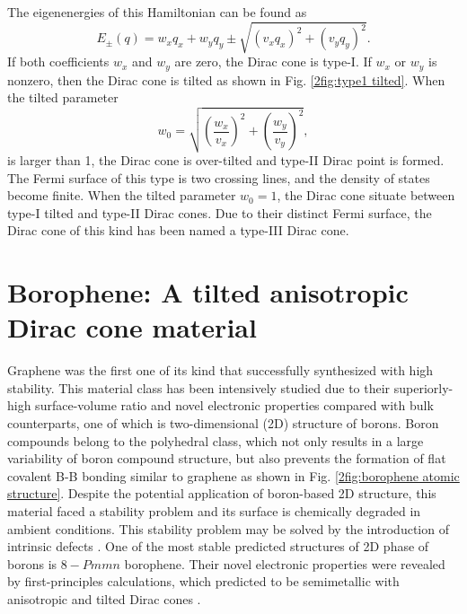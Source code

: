     The eigenenergies of this Hamiltonian can be found as
    \begin{equation} \label{2eq:eigenenergies}
        E_{\pm}(q) = w_{x}q_x + w_{y}q_y \pm \sqrt{(v_x q_x)^2 + (v_y q_y)^2}.
    \end{equation}
    If both coefficients $w_{x}$ and $w_{y}$ are zero, the Dirac cone is type-I.
    If $w_{x}$ or $w_{y}$ is nonzero, then the Dirac cone is tilted as shown in Fig. \ref{2fig:type1 tilted}.
    When the tilted parameter
    \begin{equation} \label{2eq:tilted parameter}
        w_0 = \sqrt{\left(\frac{w_x}{v_x}\right)^2 + \left(\frac{w_y}{v_y}\right)^2},
    \end{equation}
    is larger than 1, the Dirac cone is over-tilted and type-II Dirac point is formed.
    The Fermi surface of this type is two crossing lines, and the density of states become finite.
    When the tilted parameter $w_0 = 1$, the Dirac cone situate between type-I tilted and type-II Dirac cones.
    Due to their distinct Fermi surface, the Dirac cone of this kind has been named a type-III Dirac cone.

\section{Borophene: A tilted anisotropic Dirac cone material}
    Graphene was the first one of its kind that successfully synthesized with high stability.
    This material class has been intensively studied due to their superiorly-high surface-volume ratio and novel electronic properties compared with bulk counterparts, one of which is two-dimensional (2D) structure of borons.
    Boron compounds belong to the polyhedral class, which not only results in a large variability of boron compound structure, but also prevents the formation of flat covalent B-B bonding similar to graphene as shown in Fig. \ref{2fig:borophene atomic structure}.
    Despite the potential application of boron-based 2D structure, this material faced a stability problem and its surface is chemically degraded in ambient conditions.
    This stability problem may be solved by the introduction of intrinsic defects \cite{Liu2013}.
    One of the most stable predicted structures of 2D phase of borons is $8-Pmmn$ borophene.
    Their novel electronic properties were revealed by first-principles calculations, which predicted to be semimetallic with anisotropic and tilted Dirac cones \cite{Zhou2014,Lopez-Bezanilla2016}.
    
